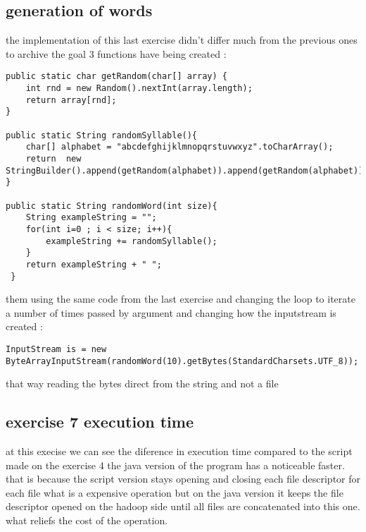 \documentclass[a4paper]{article}
\begin{document}
\subsection{generation of words}
\label{sec:orgheadline12}
the implementation of this last exercise didn't differ much from the previous ones
to archive the goal 3 functions have being created :

\begin{verbatim}
public static char getRandom(char[] array) {
    int rnd = new Random().nextInt(array.length);
    return array[rnd];
}

public static String randomSyllable(){
    char[] alphabet = "abcdefghijklmnopqrstuvwxyz".toCharArray();
    return  new StringBuilder().append(getRandom(alphabet)).append(getRandom(alphabet)).toString();
}

public static String randomWord(int size){
    String exampleString = "";
    for(int i=0 ; i < size; i++){
        exampleString += randomSyllable();
    }
    return exampleString + " ";
 }
\end{verbatim}

them using the same code from the last exercise and changing the loop to iterate a number of times passed by argument
and changing how the inputstream is created :
\begin{verbatim}
InputStream is = new ByteArrayInputStream(randomWord(10).getBytes(StandardCharsets.UTF_8));
\end{verbatim}
that way reading the bytes direct from the string and not a file


\subsection{exercise 7 execution time}
\label{sec:orgheadline13}
at this execise we can see the diference in execution time compared to the script made on the exercise 4
the java version of the program has a noticeable faster.
that is because the script version stays opening and closing each file descriptor for each file what is a expensive operation
but on the java version it keeps the file descriptor opened on the hadoop side until all files are concatenated into this one.
what reliefs the cost of the operation.
\end{document}
